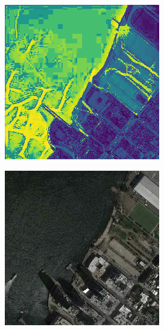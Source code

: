 \begin{figure}[ht]
\begin{subfigure}[t]{.14\textwidth}
  \end{subfigure}
  \begin{subfigure}[t]{.14\textwidth}
    \centering
    \includegraphics[width=\linewidth]{images/cycleGanResults/Maps6_diff.png}
  \end{subfigure}
  \hfill
  \begin{subfigure}[t]{.14\textwidth}
    \centering
    \includegraphics[width=\linewidth]{images/cycleGanResults/Satelite8_Or_Ld120_E100_Lr0002.jpg}

\end{subfigure}
\end{figure}
